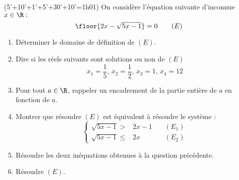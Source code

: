 \documentclass[a4paper, 11pt,reqno]{article}
\begin{document}
\begin{correction}
\begin{enumerate}
\end{enumerate}
\end{correction}






\begin{exercice}(5'+10'+1'+5'+30'+10'=1h01)
On considère l'équation suivante d'inconnue $x\in \R : $ 
$$\floor{2x-\sqrt{5x-1}} =0 \quad \quad (E)$$
\begin{enumerate}
\item Déterminer le domaine de définition de $(E)$. 
\item Dire si les réels suivants sont solutions ou non de $(E)$
$$x_1 = \frac{1}{5}, \, x_2 = \frac{1}{2}, \, x_3 =1,\, x_4=12$$
\item Pour tout $a\in \R$, rappeler  un encadrement de la partie entière de $a$ en fonction de $a$. 
\item Montrer que résoudre $(E)$ est équivalent à résoudre le système :
$$\left\{\begin{array}{clc}
\sqrt{5x-1} >&2x-1 &\quad(E_1)\\ 
\sqrt{5x-1} \leq &2x&\quad(E_2)
\end{array}\right.
$$
\item Résoudre les deux inéquations obtenues à la question précédente. 
\item Résoudre $(E)$. 
\end{enumerate}
\end{exercice}
\end{document}
